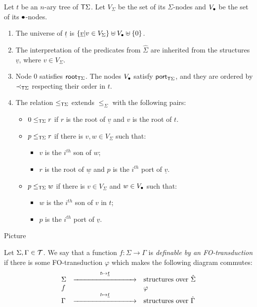 \begin{itemize}
 Let $t$ be an $n$-ary tree of $\mathsf T \Sigma$. Let $V_\Sigma$ be  the set of its $\Sigma$-nodes and $V_\bullet$ be the set of its $\bullet$-nodes. 
\begin{enumerate}
\item The universe of $\underline{t}$ is $\{\underline{v}| v\in V_\Sigma\}\uplus V_\bullet\uplus\{0\}$.
\item The interpretation of the predicates from $\hat \Sigma$ are inherited from the structures $\underline{v}$, where $v\in V_\Sigma$.
\item Node $0$ satisfies $\mathsf{root}_{\mathsf T\Sigma}$. The nodes $V_\bullet$ satisfy $\mathsf{port}_{\mathsf T\Sigma}$, and they are ordered by $\prec_{\mathsf T\Sigma}$ respecting their order in $t$. 
\item The relation $\leq_{\mathsf T\Sigma}$ extends $\leq_\Sigma$ with the following pairs:      
\begin{itemize}
\item $0\leq_{\mathsf T\Sigma} r$ if $r$ is the root of $\underline{v}$ and $v$ is the root of $t$.
\item $ p\leq_{\mathsf T\Sigma} r$ if there is $v,w \in V_\Sigma$ such that:
\begin{itemize}
\item $v$ is the $i^{th}$ son of $w$; 
\item $r$ is the root of $\underline{w}$ and $p$ is the $i^{th}$ port of $\underline{v}$.
\end{itemize}
\item $p\leq_{\mathsf T\Sigma} w$ if there is $v\in V_\Sigma$ and $w\in V_\bullet$ such that:
\begin{itemize}
\item $w$ is the $i^{th}$ son of $v$ in $t$;
\item $p$ is the $i^{th}$ port of $\underline{v}$.
\end{itemize}
\end{itemize}
\end{enumerate}
\begin{center}
Picture
\end{center}
 \end{itemize}  

\begin{definition} Let $\Sigma, \Gamma\in {\mathcal T}$. We say that a function $f:\Sigma\to \Gamma$ is \emph{definable by an FO-transduction} if there is some FO-transduction $\varphi$ which makes the following diagram commutes:
\[\begin{array}{lll}
\Sigma& \stackrel{t\mapsto \underline{t}}{\xrightarrow{\hspace*{3cm}}} & \text{structures over }\hat \Sigma \\
f&&\varphi\\
\Gamma& \stackrel{t\mapsto \underline{t}}{\xrightarrow{\hspace*{3cm}}}  & \text{structures over }\hat \Gamma 
\end{array}\]
\end{definition}

